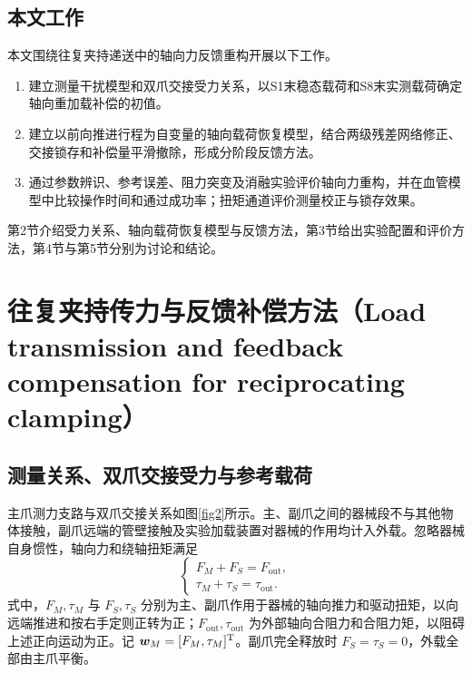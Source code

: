 \documentclass{JQRnew}
\providecommand{\RevisionColor}{\color{black}}
\newcommand{\revbegin}{\begingroup\RevisionColor}
\newcommand{\revend}{\par\endgroup}
\begin{document}
\subsection{本文工作}

本文围绕往复夹持递送中的轴向力反馈重构开展以下工作。
\begin{enumerate}[label=\arabic*),nosep,itemsep=0pt,topsep=2pt,partopsep=0pt,parsep=0pt,leftmargin=2\ccwd]
\item 建立测量干扰模型和双爪交接受力关系，以S1末稳态载荷和S8末实测载荷确定轴向重加载补偿的初值。
\item 建立以前向推进行程为自变量的轴向载荷恢复模型，结合两级残差网络修正、交接锁存和补偿量平滑撤除，形成分阶段反馈方法。
\item 通过参数辨识、参考误差、阻力突变及消融实验评价轴向力重构，并在血管模型中比较操作时间和通过成功率；扭矩通道评价测量校正与锁存效果。
\end{enumerate}

\revbegin
第2节介绍受力关系、轴向载荷恢复模型与反馈方法，第3节给出实验配置和评价方法，第4节与第5节分别为讨论和结论。
\revend

\section{往复夹持传力与反馈补偿方法（Load transmission and feedback compensation for reciprocating clamping）}

\subsection{测量关系、双爪交接受力与参考载荷}

主爪测力支路与双爪交接关系如图\ref{fig2}所示。主、副爪之间的器械段不与其他物体接触，副爪远端的管壁接触及实验加载装置对器械的作用均计入外载。忽略器械自身惯性，轴向力和绕轴扭矩满足
\begin{equation}
\label{eq:balance}
\begin{cases}
F_M+F_S=F_{\mathrm{out}},\\
\tau_M+\tau_S=\tau_{\mathrm{out}}.
\end{cases}
\end{equation}
式中，$F_M,\tau_M$ 与 $F_S,\tau_S$ 分别为主、副爪作用于器械的轴向推力和驱动扭矩，以向远端推进和按右手定则正转为正；$F_{\mathrm{out}},\tau_{\mathrm{out}}$ 为外部轴向合阻力和合阻力矩，以阻碍上述正向运动为正。记 $\bm w_M=[F_M,\tau_M]^{\rm T}$。副爪完全释放时 $F_S=\tau_S=0$，外载全部由主爪平衡。
\end{document}
